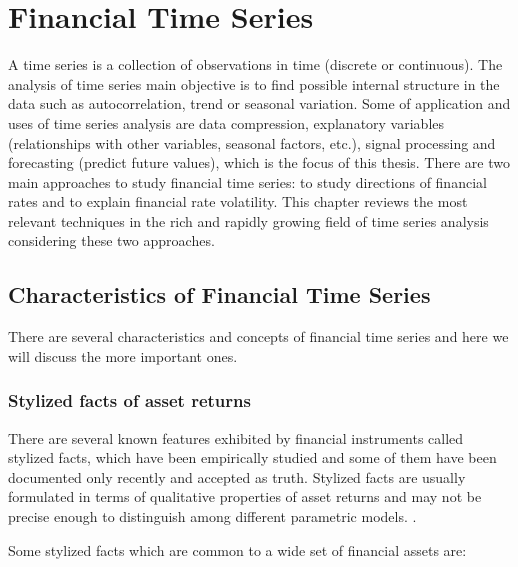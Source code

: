 
\chapter{Financial Time Series}

\vspace{0.5cm} 
 
A time series is a collection of observations in time (discrete or continuous).
The analysis of time series main objective is to find possible internal
structure in the data such as autocorrelation, trend or seasonal variation.
Some of application and uses of time series analysis are data compression,
explanatory variables (relationships with other variables, seasonal factors,
etc.), signal processing and forecasting (predict future values), which is the focus of this thesis. 
There are two main approaches to study financial time series: to study directions of financial
rates and to explain financial rate volatility.  This chapter reviews the most
relevant techniques in the rich and rapidly growing field of time series
analysis considering these two approaches.


\section{Characteristics of Financial Time Series}
There are several characteristics and concepts of financial time series and here we will discuss the more important ones.
\subsection{Stylized facts of asset returns}
\label{sec:stylizedfacts}

There are several known features exhibited by financial instruments called
stylized facts, which have been empirically studied and some of them have been
documented only recently and accepted as truth. Stylized facts are usually
formulated in terms of qualitative properties of asset returns and may not be
precise enough to distinguish among different parametric models.
\cite{cont2001}.

Some stylized facts which are common to a wide set of financial assets
\cite{sewell2011} are:

